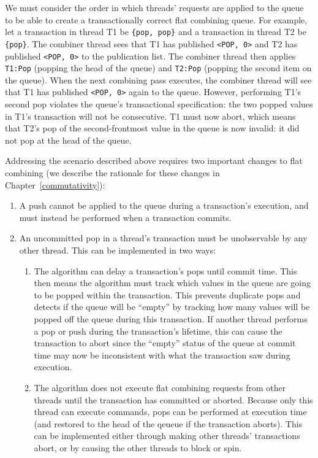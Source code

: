 We must consider the order in which threads' requests are applied to the queue to be able to create a transactionally correct flat combining queue. For example, let a transaction in thread T1 be \texttt{\{pop, pop\}} and a transaction in thread T2 be \texttt{\{pop\}}. The combiner thread sees that T1 has published \texttt{<POP, 0>} and T2 has published \texttt{<POP, 0>} to the publication list. The combiner thread then applies \texttt{T1:Pop} (popping the head of the queue) and \texttt{T2:Pop} (popping the second item on the queue). When the next combining pass executes, the combiner thread will see that T1 has published \texttt{<POP, 0>} again to the queue. However, performing T1's second pop violates the queue's transactional specification: the two popped values in T1's transaction will not be consecutive. T1 must now abort, which means that T2's pop of the second-frontmost value in the queue is now invalid: it did not pop at the head of the queue.

Addressing the scenario described above requires two important changes to flat combining (we describe the rationale for these changes in Chapter~\ref{commutativity}): 
\begin{enumerate}
\item A push cannot be applied to the queue during a transaction's execution, and must instead be performed when a transaction commits.
\item An uncommitted pop in a thread's transaction must be unobservable by any other thread. This can be implemented in two ways:  
    \begin{enumerate}
        \item The algorithm can delay a transaction's pops until commit time. This then means the algorithm must track which values in the queue are going to be popped within the transaction. This prevents duplicate pops and detects if the queue will be ``empty'' by tracking how many values will be popped off the queue during this transaction. If another thread performs a pop or push during the transaction's lifetime, this can cause the transaction to abort since the ``empty'' status of the queue at commit time may now be inconsistent with what the transaction saw during execution. 
        \item The algorithm does not execute flat combining requests from other threads until the transaction has committed or aborted. Because only this thread can execute commands, pops can be performed at execution time (and restored to the head of the qeueue if the transaction aborts). This can be implemented either through making other threads' transactions abort, or by causing the other threads to block or spin.
    \end{enumerate}
\end{enumerate}

